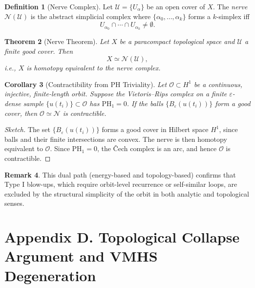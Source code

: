 \documentclass[11pt]{article}
\newtheorem{theorem}{Theorem}[section]
\newtheorem{corollary}[theorem]{Corollary}
\theoremstyle{definition}
\newtheorem{definition}[theorem]{Definition}
\newtheorem{remark}[theorem]{Remark}
\begin{document}
\begin{definition}[Nerve Complex]
Let \( \mathcal{U} = \{ U_\alpha \} \) be an open cover of \( X \). The \emph{nerve} \( \mathcal{N}(\mathcal{U}) \) is the abstract simplicial complex where \( \{ \alpha_0, \dots, \alpha_k \} \) forms a \( k \)-simplex iff
\[
U_{\alpha_0} \cap \cdots \cap U_{\alpha_k} \neq \emptyset.
\]
\end{definition}

\begin{theorem}[Nerve Theorem]
Let \( X \) be a paracompact topological space and \( \mathcal{U} \) a finite good cover. Then
\[
X \simeq \mathcal{N}(\mathcal{U}),
\]
i.e., \( X \) is homotopy equivalent to the nerve complex.
\end{theorem}

\begin{corollary}[Contractibility from PH Triviality]
Let \( \mathcal{O} \subset H^1 \) be a continuous, injective, finite-length orbit. Suppose the Vietoris–Rips complex on a finite \( \varepsilon \)-dense sample \( \{ u(t_i) \} \subset \mathcal{O} \) has \( \mathrm{PH}_1 = 0 \). If the balls \( \{ B_\varepsilon(u(t_i)) \} \) form a good cover, then \( \mathcal{O} \simeq \mathcal{N} \) is contractible.
\end{corollary}

\begin{proof}[Sketch]
The set \( \{ B_\varepsilon(u(t_i)) \} \) forms a good cover in Hilbert space \( H^1 \), since balls and their finite intersections are convex. The nerve is then homotopy equivalent to \( \mathcal{O} \). Since \( \mathrm{PH}_1 = 0 \), the Čech complex is an arc, and hence \( \mathcal{O} \) is contractible.
\end{proof}

\begin{remark}
This dual path (energy-based and topology-based) confirms that Type I blow-ups, which require orbit-level recurrence or self-similar loops, are excluded by the structural simplicity of the orbit in both analytic and topological senses.
\end{remark}


\section*{Appendix D. Topological Collapse Argument and VMHS Degeneration}
\end{document}
